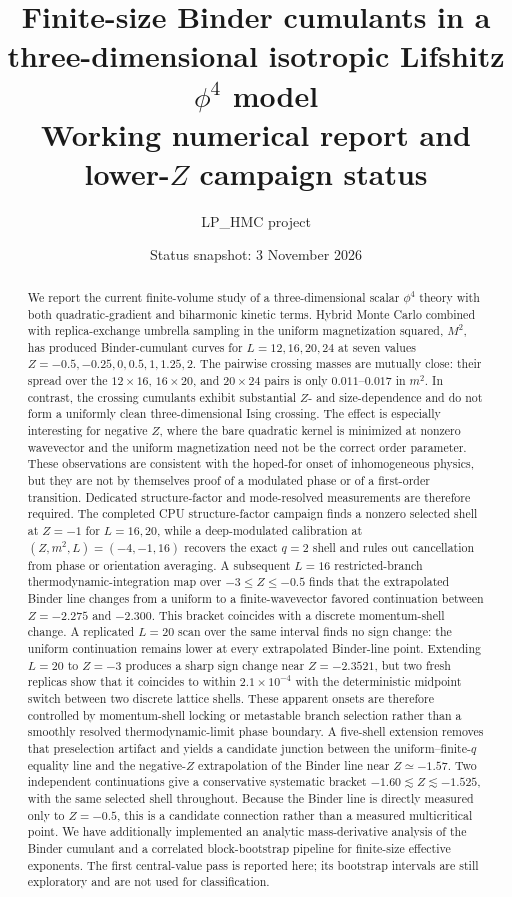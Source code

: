 \documentclass[11pt]{article}
\title{\textbf{Finite-size Binder cumulants in a three-dimensional isotropic
Lifshitz $\phi^4$ model}\\[0.4em]
\large Working numerical report and lower-$Z$ campaign status}
\author{LP\_HMC project}
\date{Status snapshot: 3 November 2026}
\begin{document}
\maketitle

\begin{abstract}
We report the current finite-volume study of a three-dimensional scalar
$\phi^4$ theory with both quadratic-gradient and biharmonic kinetic terms.
Hybrid Monte Carlo combined with replica-exchange umbrella sampling in the
uniform magnetization squared, $M^2$, has produced Binder-cumulant curves for
$L=12,16,20,24$ at seven values $Z=-0.5,-0.25,0,0.5,1,1.25,2$.
The pairwise crossing masses are mutually close: their spread over the
$12\!\times\!16$, $16\!\times\!20$, and $20\!\times\!24$ pairs is only
$0.011$--$0.017$ in $m^2$.  In contrast, the crossing cumulants exhibit
substantial $Z$- and size-dependence and do not form a uniformly clean
three-dimensional Ising crossing.  The effect is especially interesting for
negative $Z$, where the bare quadratic kernel is minimized at nonzero
wavevector and the uniform magnetization need not be the correct order
parameter.  These observations are consistent with the hoped-for onset of
inhomogeneous physics, but they are not by themselves proof of a modulated
phase or of a first-order transition.  Dedicated structure-factor and
mode-resolved measurements are therefore required.  The completed CPU
structure-factor campaign finds a nonzero selected shell at $Z=-1$ for
$L=16,20$, while a deep-modulated calibration at $(Z,m^2,L)=(-4,-1,16)$
recovers the exact $q=2$ shell and rules out cancellation from phase or
orientation averaging.  A subsequent $L=16$ restricted-branch
thermodynamic-integration map over $-3\leq Z\leq-0.5$ finds that the
extrapolated Binder line changes from a uniform to a finite-wavevector favored
continuation between $Z=-2.275$ and $-2.300$.  This bracket coincides with a
discrete momentum-shell change.  A replicated $L=20$ scan over the same
interval finds no sign change: the uniform continuation remains lower at every
extrapolated Binder-line point.  Extending $L=20$ to $Z=-3$ produces a sharp
sign change near $Z=-2.3521$, but two fresh replicas show that it coincides to
within $2.1\times10^{-4}$ with the deterministic midpoint switch between two
discrete lattice shells.  These apparent onsets are therefore controlled by
momentum-shell locking or metastable branch selection rather than a smoothly
resolved thermodynamic-limit phase boundary.  A five-shell extension removes
that preselection artifact and yields a candidate junction between the
uniform--finite-$q$ equality line and the negative-$Z$ extrapolation of the
Binder line near $Z\simeq-1.57$.  Two independent continuations give a
conservative systematic bracket $-1.60\lesssim Z\lesssim-1.525$, with the same
selected shell throughout.  Because the Binder line is directly measured only
to $Z=-0.5$, this is a candidate connection rather than a measured
multicritical point.
We have additionally implemented an analytic mass-derivative analysis of the
Binder cumulant and a correlated block-bootstrap pipeline for finite-size
effective exponents.  The first central-value pass is reported here; its
bootstrap intervals are still exploratory and are not used for classification.
\end{abstract}
\end{document}
